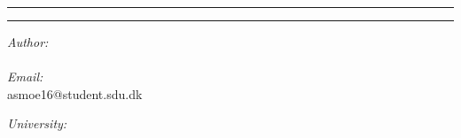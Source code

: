 \documentclass[../main.tex]{subfiles}
\begin{document}
\vspace{3cm}
\hrule
\begin{center}
	{\bf\Huge\Title}
\end{center}
\hrule
\begin{multicols}{2}
	\begin{flushleft}
		\textit{Author:} \\
		\Author\\
		\vspace{10pt}
		\textit{Email:} \\
		asmoe16@student.sdu.dk

	\end{flushleft}
	\columnbreak
	\begin{flushright}
		\textit{University:}\\
		\University
	\end{flushright}
\end{multicols}
\end{document}
